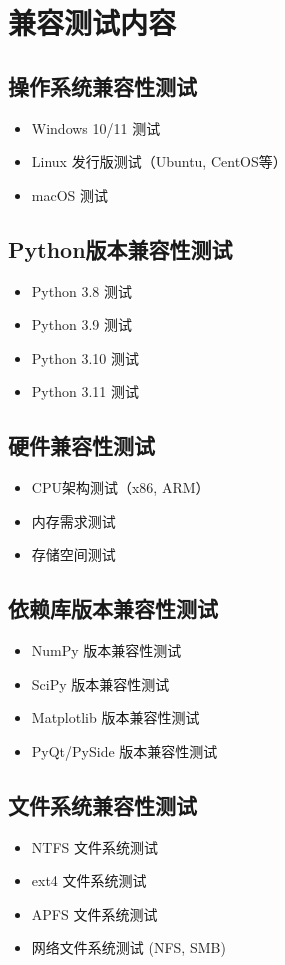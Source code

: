 \documentclass[a4paper,12pt]{report}	%
\begin{document}
\chapter{兼容测试内容}

\section{操作系统兼容性测试}
\begin{itemize}
    \item Windows 10/11 测试
    \item Linux 发行版测试（Ubuntu, CentOS等）
    \item macOS 测试
\end{itemize}

\section{Python版本兼容性测试}
\begin{itemize}
    \item Python 3.8 测试
    \item Python 3.9 测试
    \item Python 3.10 测试
    \item Python 3.11 测试
\end{itemize}

\section{硬件兼容性测试}
\begin{itemize}
    \item CPU架构测试（x86, ARM）
    \item 内存需求测试
    \item 存储空间测试
\end{itemize}

\section{依赖库版本兼容性测试}
\begin{itemize}
    \item NumPy 版本兼容性测试
    \item SciPy 版本兼容性测试
    \item Matplotlib 版本兼容性测试
    \item PyQt/PySide 版本兼容性测试
\end{itemize}

\section{文件系统兼容性测试}
\begin{itemize}
    \item NTFS 文件系统测试
    \item ext4 文件系统测试
    \item APFS 文件系统测试
    \item 网络文件系统测试 (NFS, SMB)
\end{itemize}




% 
% 
\end{document}
